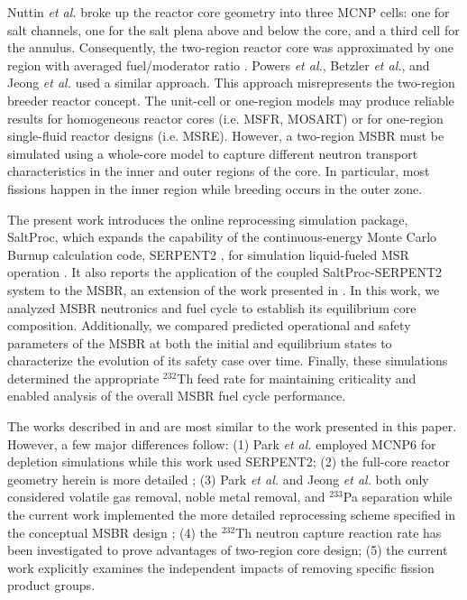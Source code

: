 Nuttin \emph{et al.} broke up the reactor core geometry into three \gls{MCNP} cells: 
one for salt channels, one for the salt plena above and below the core, and a 
third cell for the annulus. Consequently, the two-region reactor core was 
approximated by one region with averaged fuel/moderator ratio 
\cite{nuttin_potential_2005}.  Powers \emph{et 
al.}, Betzler \emph{et al.}, and Jeong \emph{et al.} 
\cite{powers_new_2013,powers_inventory_2014,betzler_modeling_2016, 
betzler_molten_2017, jeong_development_2014, jeong_equilibrium_2016} used a 
similar approach. This approach 
misrepresents the two-region breeder reactor concept. The unit-cell or one-region 
models may produce reliable results for homogeneous reactor cores (i.e. 
\gls{MSFR}, \gls{MOSART}) or for one-region single-fluid reactor designs (i.e. 
\gls{MSRE}). However, a two-region \gls{MSBR} must be simulated using a whole-core 
model to capture different neutron transport characteristics in the inner and 
outer regions of the core. In particular, most fissions happen in the inner 
region while breeding occurs in the outer zone. 

The present work introduces the online reprocessing simulation package, SaltProc, 
which expands the capability of the continuous-energy Monte Carlo Burnup 
calculation code, SERPENT2 \cite{leppanen_serpent_2015}, for simulation 
liquid-fueled \gls{MSR} operation 
\cite{rykhlevskii_modeling_2019}. It also reports the 
application of the coupled SaltProc-SERPENT2 system to the \gls{MSBR}, an 
extension of the work presented in 
\cite{rykhlevskii_full-core_2017, rykhlevskii_online_2017}. In this work, we 
analyzed \gls{MSBR} neutronics and fuel cycle to establish its equilibrium core 
composition. Additionally, we compared predicted operational and safety parameters of the \gls{MSBR} at 
both the initial and equilibrium states to characterize the evolution of its 
safety case over time. Finally, these simulations determined the appropriate $^{232}$Th feed rate  
for maintaining criticality and enabled analysis of the overall \gls{MSBR} fuel 
cycle performance.

The works described in \cite{park_whole_2015} and \cite{jeong_equilibrium_2016} 
are most similar to the work presented in this paper. However, a few major 
differences follow: (1) Park \emph{et al.} employed MCNP6 for depletion 
simulations while this work used SERPENT2; (2) the full-core reactor 
geometry herein is more detailed \cite{rykhlevskii_full-core_2017}; (3) Park \emph{et al.} and Jeong \emph{et al.} 
both only considered volatile gas removal, noble metal removal, and $^{233}$Pa separation while 
the current work implemented the more detailed reprocessing scheme specified in 
the conceptual \gls{MSBR} design \cite{robertson_conceptual_1971}; (4) the $^{232}$Th neutron 
capture reaction rate has been investigated to prove advantages of two-region core 
design; (5) the current work explicitly examines the independent impacts of removing specific fission product groups. 

